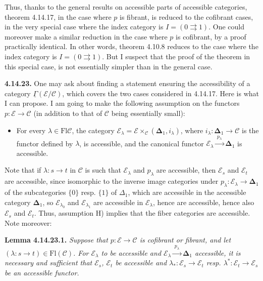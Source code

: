 \documentclass[11pt]{article}
\newcommand{\printedpage}[1]{\marginpar{\footnotesize p.~#1}}
\newcommand{\msp}[1]{\marginpar{\footnotesize [#1]}}
\newcommand{\uGamma}{\underline{\Gamma}}
\newcommand{\bDelta}{\boldsymbol{\Delta}}
\newcommand{\Fl}{\mathrm{Fl}}
\begin{document}
Thus, thanks to the general results on accessible parts of accessible categories, theorem 4.14.17, in the case where $p$ is fibrant, is reduced to the cofibrant cases, in the very special case where the index category is $I=(0\rightrightarrows 1)$. One could moreover make a similar reduction in the case where $p$ is cofibrant, by a proof practically %
\printedpage{155}
identical. In other words, theorem 4.10.8 reduces to the case where the index category is $I=(0\rightrightarrows 1)$. But I suspect that the proof of the theorem in this special case, is not essentially simpler than in the general case.

\msp{page 409}

\textbf{4.14.23.} One may ask about finding a statement ensuring the accessibility of a category $\uGamma(\mathcal{E}/\mathcal{C})$, which covers the two cases considered in 4.14.17. Here is what I can propose. I am going to make the following assumption on the functors $p:\mathcal{E}\longrightarrow\mathcal{C}$ (in addition to that of $\mathcal{C}$ being essentially small): %

\begin{itemize}[leftmargin=*]
\item[H)] For every $\lambda\in\Fl\mathcal{C}$, the category $\mathcal{E}_\lambda=\mathcal{E}\times_{\mathcal{C}}(\bDelta_1,i_\lambda)$, where $i_\lambda:\bDelta_1\longrightarrow\mathcal{C}$ is the functor defined by $\lambda$, is accessible, and the canonical functor $\mathcal{E}_\lambda\xrightarrow{\;p_\lambda\;}\bDelta_1$ is accessible.
\end{itemize}

Note that if $\lambda:s\longrightarrow t$ in $\mathcal{C}$ is such that $\mathcal{E}_\lambda$ and $p_\lambda$ are accessible, then $\mathcal{E}_s$ and $\mathcal{E}_t$ are accessible, since isomorphic to the inverse image categories under $p_\lambda:\mathcal{E}_\lambda\longrightarrow\bDelta_1$ of the subcategories $\{0\}$ resp. $\{1\}$ of $\Delta_1$, which are accessible in the accessible category $\bDelta_1$, so %
\msp{page 410}
$\mathcal{E}_{\lambda_0}$ and $\mathcal{E}_{\lambda_1}$ are accessible in $\mathcal{E}_\lambda$, hence are accessible, hence also $\mathcal{E}_s$ and $\mathcal{E}_t$. Thus, assumption H) implies that the fiber categories are accessible. Note moreover:

\textbf{Lemma 4.14.23.1.} \textit{Suppose that $p:\mathcal{E}\longrightarrow\mathcal{C}$ is cofibrant or fibrant, and let $(\lambda:s\longrightarrow t)\in\Fl(\mathcal{C})$. For $\mathcal{E}_\lambda$ to be accessible and $\mathcal{E}_\lambda\xrightarrow{\;p_\lambda\;}\bDelta_1$ accessible, it is necessary and sufficient that $\mathcal{E}_s$, $\mathcal{E}_t$ be accessible and $\lambda_*:\mathcal{E}_s\longrightarrow\mathcal{E}_t$ resp. $\lambda^*:\mathcal{E}_t\longrightarrow\mathcal{E}_s$ be an accessible functor.}
\end{document}
